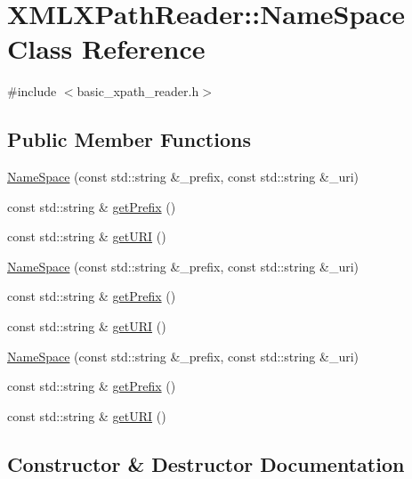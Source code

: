 \hypertarget{classXMLXPathReader_1_1NameSpace}{}\section{X\+M\+L\+X\+Path\+Reader\+:\+:Name\+Space Class Reference}
\label{classXMLXPathReader_1_1NameSpace}


{\ttfamily \#include $<$basic\+\_\+xpath\+\_\+reader.\+h$>$}

\subsection*{Public Member Functions}
\begin{DoxyCompactItemize}
\item 
\mbox{\hyperlink{classXMLXPathReader_1_1NameSpace_a66254008c400f9a4396de32654e37ac6}{Name\+Space}} (const std\+::string \&\+\_\+prefix, const std\+::string \&\+\_\+uri)
\item 
const std\+::string \& \mbox{\hyperlink{classXMLXPathReader_1_1NameSpace_a4060213f4e2b90fa3cbd3f7ab7d455a0}{get\+Prefix}} ()
\item 
const std\+::string \& \mbox{\hyperlink{classXMLXPathReader_1_1NameSpace_a4845bf9963c2687097a8265cea22e703}{get\+U\+RI}} ()
\item 
\mbox{\hyperlink{classXMLXPathReader_1_1NameSpace_a66254008c400f9a4396de32654e37ac6}{Name\+Space}} (const std\+::string \&\+\_\+prefix, const std\+::string \&\+\_\+uri)
\item 
const std\+::string \& \mbox{\hyperlink{classXMLXPathReader_1_1NameSpace_a4060213f4e2b90fa3cbd3f7ab7d455a0}{get\+Prefix}} ()
\item 
const std\+::string \& \mbox{\hyperlink{classXMLXPathReader_1_1NameSpace_a4845bf9963c2687097a8265cea22e703}{get\+U\+RI}} ()
\item 
\mbox{\hyperlink{classXMLXPathReader_1_1NameSpace_a66254008c400f9a4396de32654e37ac6}{Name\+Space}} (const std\+::string \&\+\_\+prefix, const std\+::string \&\+\_\+uri)
\item 
const std\+::string \& \mbox{\hyperlink{classXMLXPathReader_1_1NameSpace_a4060213f4e2b90fa3cbd3f7ab7d455a0}{get\+Prefix}} ()
\item 
const std\+::string \& \mbox{\hyperlink{classXMLXPathReader_1_1NameSpace_a4845bf9963c2687097a8265cea22e703}{get\+U\+RI}} ()
\end{DoxyCompactItemize}


\subsection{Constructor \& Destructor Documentation}
\mbox{\label{classXMLXPathReader_1_1NameSpace_a66254008c400f9a4396de32654e37ac6}} 
